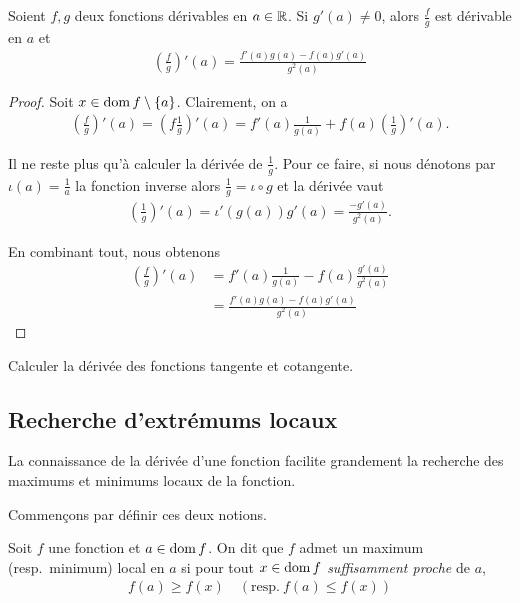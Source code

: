 \documentclass[main.tex]{subfiles}
\begin{document}
\begin{proposition}

    Soient $f, g$ deux fonctions dérivables en $a \in \mathbb{R}$.
    Si $g'(a) \neq 0$,
    alors $\frac f g$ est dérivable en $a$ et
    \begin{align}
        \left(\frac f g\right)'(a) = \frac {f'(a) g(a) - f(a) g'(a)} {g^2(a)}
    \end{align}
\end{proposition}
\begin{proof}
    Soit $x \in \operatorname{dom} f \setminus \{a\}$.
    Clairement,
    on a
    \begin{align}
        \left(\frac f g\right)'(a)
        = \left(f \frac 1 g\right)'(a)
        = f'(a) \frac 1 {g(a)} + f(a) \left(\frac 1 g\right)'(a).
    \end{align}

    Il ne reste plus qu'à calculer la dérivée de $\frac 1 g$.
    Pour ce faire,
    si nous dénotons par $\iota(a) = \frac 1 a$ la fonction inverse
    alors $\frac 1 g = \iota \circ g$ et la dérivée vaut
    \begin{align}
        \left(\frac 1 g\right)'(a) = \iota'(g(a)) g'(a) = \frac {-g'(a)} {g^2(a)}.
    \end{align}

    En combinant tout,
    nous obtenons
    \begin{align}
        \left(\frac f g\right)'(a)
        &= f'(a) \frac 1 {g(a)} - f(a) \frac {g'(a)} {g^2(a)}\\
        &= \frac {f'(a) g(a) - f(a) g'(a)} {g^2(a)}
    \end{align}
\end{proof}

\begin{exercise}
    Calculer la dérivée des fonctions tangente et cotangente.
\end{exercise}

\subsection{Recherche d'extrémums locaux}

La connaissance de la dérivée d'une fonction facilite grandement la recherche des maximums et minimums locaux de la fonction.

Commençons par définir ces deux notions.

\begin{definition}

    Soit $f$ une fonction et $a \in \operatorname{dom} f$.
    On dit que $f$ admet un maximum (resp.\ minimum) local en $a$ si
    pour tout $x \in \operatorname{dom} f$ \emph{suffisamment proche} de $a$,
    \begin{align}
        f(a) \ge f(x) \quad \left(\text{resp.}\ f(a) \le f(x)\right)
    \end{align}
\end{definition}
\end{document}
